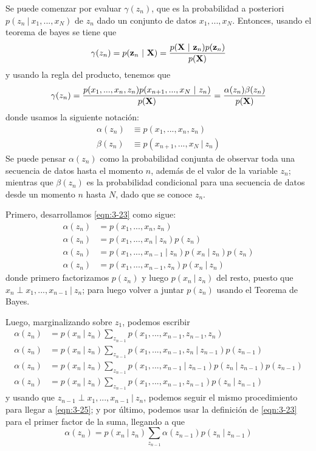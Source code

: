 Se puede comenzar por evaluar $\gamma(z_n)$, que es la probabilidad a posteriori $p(z_n ~|~ x_1, ..., x_N)$ de $z_n$ dado un conjunto de datos $x_1, ..., x_N$. Entonces, usando el teorema de bayes se tiene que
\begin{equation}
  \gamma(z_n) = p(\textbf{z}_n ~|~ \textbf{X}) = 
    \frac{p(\textbf{X} ~|~ \textbf{z}_n) p(\textbf{z}_n)}{p(\textbf{X})} 
  \label{eqn:3-21}
\end{equation}
y usando la regla del producto, tenemos que
\begin{equation}
  \gamma(z_n) = \frac{
    p(x_1, ..., x_n, z_n) p(x_{n+1}, ..., x_N ~|~ z_n) 
    }
    {p(\textbf{X})} = \frac{\alpha(z_n) \beta(z_n)}{p(\textbf{X})}
  \label{eqn:3-22}
\end{equation}
donde usamos la siguiente notación:
\begin{align}
  \alpha(z_n) &\equiv p(x_1, ..., x_n, z_n) 
\label{eqn:3-23} \\
  \beta(z_n) &\equiv p(x_{n+1}, ..., x_N ~|~ z_n) 
  \label{eqn:3-24}
\end{align}
Se puede pensar $\alpha(z_n)$ como la probabilidad conjunta de observar toda una secuencia de datos hasta el momento $n$, además de el valor de la variable $z_n$; mientras que $\beta(z_n)$ es la probabilidad condicional para una secuencia de datos desde un momento $n$ hasta $N$, dado que se conoce $z_n$. 

Primero, desarrollamos \eqref{eqn:3-23} como sigue:
\begin{align}
  \alpha(z_n) &= p(x_1, ..., x_n, z_n)  \\
  \alpha(z_n) &= p(x_1, ..., x_n ~|~ z_n)  p(z_n) \\
  \alpha(z_n) &= p(x_1, ..., x_{n-1} ~|~ z_n) p(x_n ~|~ z_n)  p(z_n) \\
  \alpha(z_n) &= p(x_1, ..., x_{n-1}, z_n) p(x_n ~|~ z_n)
\end{align}
donde primero factorizamos $p(z_n)$ y luego $p(x_n ~|~ z_n)$ del resto, puesto que $x_n \perp x_1, ... , x_{n-1} ~|~ z_n$; para luego volver a juntar $p(z_n)$
usando el Teorema de Bayes.

Luego, marginalizando sobre $z_1$, podemos escribir
\begin{align}  
  \alpha(z_n) &= p(x_n ~|~ z_n) \sum_{z_{n-1}} 
    p(x_1, ..., x_{n-1}, z_{n-1}, z_n) \\
  \alpha(z_n) &= p(x_n ~|~ z_n) \sum_{z_{n-1}} 
    p(x_1, ..., x_{n-1}, z_n ~|~ z_{n-1}) p(z_{n-1}) \\  
  \alpha(z_n) &= p(x_n ~|~ z_n) \sum_{z_{n-1}} 
    p(x_1, ..., x_{n-1} ~|~ z_{n-1}) p(z_n ~|~ z_{n-1}) p(z_{n-1}) \\      
  \alpha(z_n) &= p(x_n ~|~ z_n) \sum_{z_{n-1}} 
    p(x_1, ..., x_{n-1}, z_{n-1}) p(z_n ~|~ z_{n-1})
    \label{eqn:3-25}
\end{align}
y usando que $z_{n-1} \perp x_1, ... , x_{n-1} ~|~ z_n$, podemos seguir el mismo procedimiento para llegar a \eqref{eqn:3-25}; y por último, podemos usar la definición de \eqref{eqn:3-23} para el primer factor de la suma, llegando a que
\begin{equation}
  \alpha(z_n) = p(x_n ~|~ z_n) \sum_{z_{n-1}} 
    \alpha(z_{n-1}) p(z_n ~|~ z_{n-1})
\end{equation}

